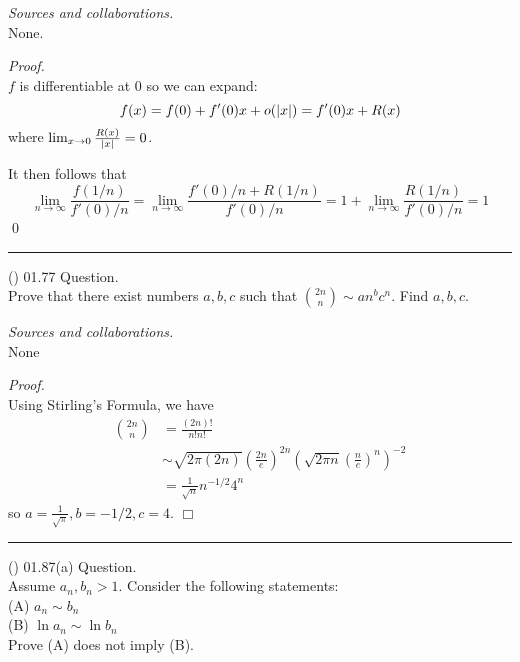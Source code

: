 \documentclass{amsart}
\begin{document}
\medskip\noindent
\emph{Sources and collaborations.}\\
None.

\medskip\noindent
\emph{Proof.}\\
$f$ is differentiable at 0 so we can expand:
\begin{equation*}
f(x) = f(0) + f'(0)x + o(\lvert x\rvert) = f'(0)x + R(x)
\end{equation*}
where $\lim_{x \to 0} \frac{R(x)}{\lvert x\rvert} = 0$.

It then follows that \begin{equation*}
\lim_{n \to \infty} \frac{f(1/n)}{f'(0)/n} = \lim_{n \to \infty} \frac{f'(0)/n + R(1/n)}{f'(0)/n} = 1 + \lim_{n \to \infty} \frac{R(1/n)}{f'(0)/n} = 1
\end{equation*}
\qed

\bigskip\hrule

\vspace{0.5cm}

\newpage
\Large
{}

\noindent
(\done) 01.77 Question. \\
Prove that there exist numbers $a, b, c$ such that $\binom{2n}{n} \sim an^bc^n$. Find $a, b, c$.

\medskip\noindent
\emph{Sources and collaborations.}\\
None

\medskip\noindent
\emph{Proof.}\\
Using Stirling's Formula, we have
\begin{align*}
    \binom{2n}{n} &= \frac{(2n)!}{n!n!} \\
    &\sim \sqrt{2\pi(2n)} \left(\frac{2n}{e}\right)^{2n} \left(\sqrt{2\pi n}\left(\frac{n}{e}\right)^n\right)^{-2} \\
    &= \frac{1}{\sqrt{n}}n^{-1/2}4^{n}
\end{align*}
so $a = \frac{1}{\sqrt{\pi}}, b = -1/2, c = 4$.
\hfill $\Box$

\bigskip\hrule

\vspace{0.5cm}





\newpage
\Large
{}

\noindent
(\done) 01.87(a) Question. \\
Assume $a_n, b_n > 1$. Consider the following statements:\\
(A) $a_n \sim b_n$\\
(B) $\ln a_n \sim \ln b_n$\\
Prove (A) does not imply (B).
\end{document}
